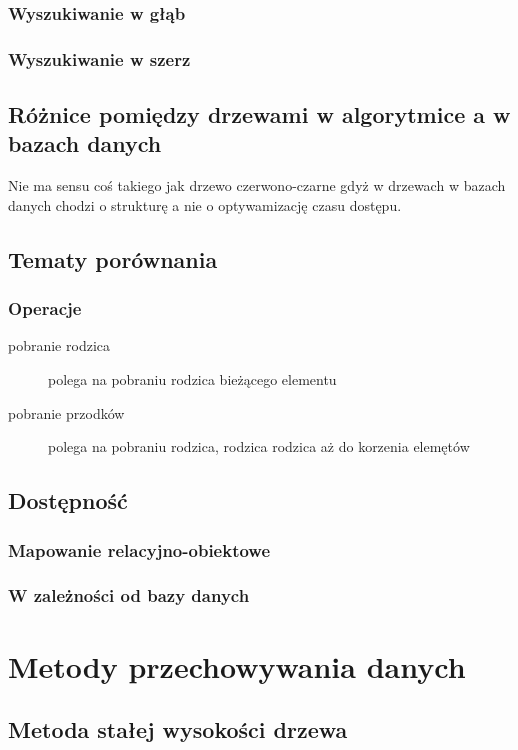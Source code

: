 \documentclass[10pt,a4paper,oneside]{book}
\begin{document}
\subsection{Wyszukiwanie w głąb}
\subsection{Wyszukiwanie w szerz}


\section{Różnice pomiędzy drzewami w algorytmice a w bazach danych}

Nie ma sensu coś takiego jak drzewo czerwono-czarne gdyż w drzewach w bazach danych chodzi o strukturę a nie o optywamizację czasu dostępu.

\section{Tematy porównania}
\subsection{Operacje}
\begin{description}
 \item[pobranie rodzica] polega na pobraniu rodzica bieżącego elementu
 \item[pobranie przodków] polega na pobraniu rodzica, rodzica rodzica aż do korzenia elemętów
 \end{description}

\section{Dostępność}
\subsection{Mapowanie relacyjno-obiektowe}
\subsection{W zależności od bazy danych}

\chapter{Metody przechowywania danych}

\section{Metoda stałej wysokości drzewa}
\end{document}
